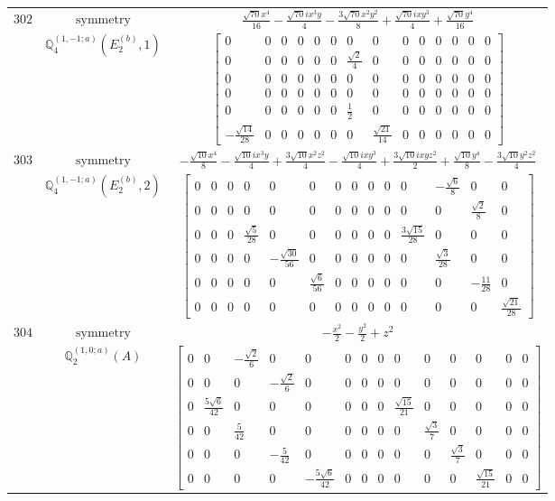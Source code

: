 \documentclass[fleqn,8pt,landscape]{jsarticle}
\begin{document}
\begin{longtable}{ccc}
$ 302 $ & $ \text{symmetry} $ & $ \frac{\sqrt{70} x^{4}}{16} - \frac{\sqrt{70} i x^{3} y}{4} - \frac{3 \sqrt{70} x^{2} y^{2}}{8} + \frac{\sqrt{70} i x y^{3}}{4} + \frac{\sqrt{70} y^{4}}{16} $ \\
$  $ & $ \mathbb{Q}_{4}^{(1,-1;a)}(E_{2}^{(b)},1) $ & $ \begin{bmatrix} 0 & 0 & 0 & 0 & 0 & 0 & 0 & 0 & 0 & 0 & 0 & 0 & 0 & 0 \\ 0 & 0 & 0 & 0 & 0 & 0 & \frac{\sqrt{2}}{4} & 0 & 0 & 0 & 0 & 0 & 0 & 0 \\ 0 & 0 & 0 & 0 & 0 & 0 & 0 & 0 & 0 & 0 & 0 & 0 & 0 & 0 \\ 0 & 0 & 0 & 0 & 0 & 0 & 0 & 0 & 0 & 0 & 0 & 0 & 0 & 0 \\ 0 & 0 & 0 & 0 & 0 & 0 & \frac{1}{2} & 0 & 0 & 0 & 0 & 0 & 0 & 0 \\ - \frac{\sqrt{14}}{28} & 0 & 0 & 0 & 0 & 0 & 0 & \frac{\sqrt{21}}{14} & 0 & 0 & 0 & 0 & 0 & 0 \end{bmatrix} $ \\ \hline
$ 303 $ & $ \text{symmetry} $ & $ - \frac{\sqrt{10} x^{4}}{8} - \frac{\sqrt{10} i x^{3} y}{4} + \frac{3 \sqrt{10} x^{2} z^{2}}{4} - \frac{\sqrt{10} i x y^{3}}{4} + \frac{3 \sqrt{10} i x y z^{2}}{2} + \frac{\sqrt{10} y^{4}}{8} - \frac{3 \sqrt{10} y^{2} z^{2}}{4} $ \\
$  $ & $ \mathbb{Q}_{4}^{(1,-1;a)}(E_{2}^{(b)},2) $ & $ \begin{bmatrix} 0 & 0 & 0 & 0 & 0 & 0 & 0 & 0 & 0 & 0 & 0 & - \frac{\sqrt{6}}{8} & 0 & 0 \\ 0 & 0 & 0 & 0 & 0 & 0 & 0 & 0 & 0 & 0 & 0 & 0 & \frac{\sqrt{2}}{8} & 0 \\ 0 & 0 & 0 & \frac{\sqrt{5}}{28} & 0 & 0 & 0 & 0 & 0 & 0 & \frac{3 \sqrt{15}}{28} & 0 & 0 & 0 \\ 0 & 0 & 0 & 0 & - \frac{\sqrt{30}}{56} & 0 & 0 & 0 & 0 & 0 & 0 & \frac{\sqrt{3}}{28} & 0 & 0 \\ 0 & 0 & 0 & 0 & 0 & \frac{\sqrt{6}}{56} & 0 & 0 & 0 & 0 & 0 & 0 & - \frac{11}{28} & 0 \\ 0 & 0 & 0 & 0 & 0 & 0 & 0 & 0 & 0 & 0 & 0 & 0 & 0 & \frac{\sqrt{21}}{28} \end{bmatrix} $ \\ \hline
$ 304 $ & $ \text{symmetry} $ & $ - \frac{x^{2}}{2} - \frac{y^{2}}{2} + z^{2} $ \\
$  $ & $ \mathbb{Q}_{2}^{(1,0;a)}(A) $ & $ \begin{bmatrix} 0 & 0 & - \frac{\sqrt{2}}{6} & 0 & 0 & 0 & 0 & 0 & 0 & 0 & 0 & 0 & 0 & 0 \\ 0 & 0 & 0 & - \frac{\sqrt{2}}{6} & 0 & 0 & 0 & 0 & 0 & 0 & 0 & 0 & 0 & 0 \\ 0 & \frac{5 \sqrt{6}}{42} & 0 & 0 & 0 & 0 & 0 & 0 & \frac{\sqrt{15}}{21} & 0 & 0 & 0 & 0 & 0 \\ 0 & 0 & \frac{5}{42} & 0 & 0 & 0 & 0 & 0 & 0 & \frac{\sqrt{3}}{7} & 0 & 0 & 0 & 0 \\ 0 & 0 & 0 & - \frac{5}{42} & 0 & 0 & 0 & 0 & 0 & 0 & \frac{\sqrt{3}}{7} & 0 & 0 & 0 \\ 0 & 0 & 0 & 0 & - \frac{5 \sqrt{6}}{42} & 0 & 0 & 0 & 0 & 0 & 0 & \frac{\sqrt{15}}{21} & 0 & 0 \end{bmatrix} $ \\ \hline

\end{longtable}
\end{document}

